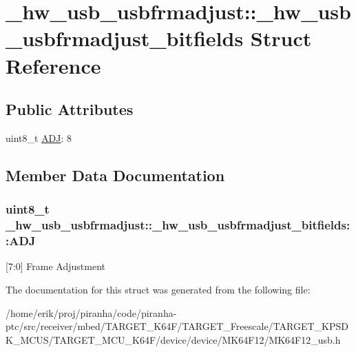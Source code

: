 \hypertarget{struct__hw__usb__usbfrmadjust_1_1__hw__usb__usbfrmadjust__bitfields}{}\section{\+\_\+hw\+\_\+usb\+\_\+usbfrmadjust\+:\+:\+\_\+hw\+\_\+usb\+\_\+usbfrmadjust\+\_\+bitfields Struct Reference}
\label{struct__hw__usb__usbfrmadjust_1_1__hw__usb__usbfrmadjust__bitfields}
\subsection*{Public Attributes}
\begin{DoxyCompactItemize}
\item 
uint8\+\_\+t \hyperlink{struct__hw__usb__usbfrmadjust_1_1__hw__usb__usbfrmadjust__bitfields_a9e8ea9f0b3905f384cb76e8371476914}{A\+DJ}\+: 8
\end{DoxyCompactItemize}


\subsection{Member Data Documentation}
\subsubsection[{\texorpdfstring{A\+DJ}{ADJ}}]{\setlength{\rightskip}{0pt plus 5cm}uint8\+\_\+t \+\_\+hw\+\_\+usb\+\_\+usbfrmadjust\+::\+\_\+hw\+\_\+usb\+\_\+usbfrmadjust\+\_\+bitfields\+::\+A\+DJ}\hypertarget{struct__hw__usb__usbfrmadjust_1_1__hw__usb__usbfrmadjust__bitfields_a9e8ea9f0b3905f384cb76e8371476914}{}\label{struct__hw__usb__usbfrmadjust_1_1__hw__usb__usbfrmadjust__bitfields_a9e8ea9f0b3905f384cb76e8371476914}
\mbox{[}7\+:0\mbox{]} Frame Adjustment 

The documentation for this struct was generated from the following file\+:\begin{DoxyCompactItemize}
\item 
/home/erik/proj/piranha/code/piranha-\/ptc/src/receiver/mbed/\+T\+A\+R\+G\+E\+T\+\_\+\+K64\+F/\+T\+A\+R\+G\+E\+T\+\_\+\+Freescale/\+T\+A\+R\+G\+E\+T\+\_\+\+K\+P\+S\+D\+K\+\_\+\+M\+C\+U\+S/\+T\+A\+R\+G\+E\+T\+\_\+\+M\+C\+U\+\_\+\+K64\+F/device/device/\+M\+K64\+F12/M\+K64\+F12\+\_\+usb.\+h\end{DoxyCompactItemize}
